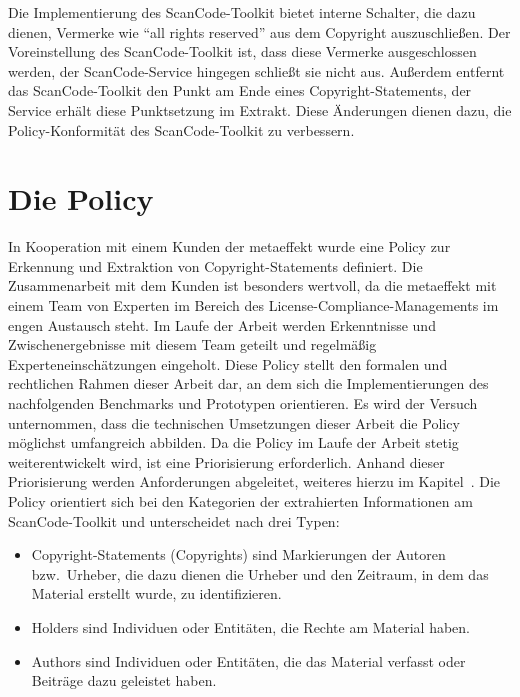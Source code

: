 Die Implementierung des ScanCode-Toolkit bietet interne Schalter, die dazu dienen, Vermerke wie \enquote{all rights reserved} aus dem Copyright auszuschließen.
Der Voreinstellung des ScanCode-Toolkit ist, dass diese Vermerke ausgeschlossen werden, der ScanCode-Service hingegen schließt sie nicht aus.
Außerdem entfernt das ScanCode-Toolkit den Punkt am Ende eines Copyright-Statements, der Service erhält diese Punktsetzung im Extrakt.
Diese Änderungen dienen dazu, die Policy-Konformität des ScanCode-Toolkit zu verbessern\autocite{noauthor_metaeffekt-scancode-service_2025}.


\section{Die Policy}\label{sec:policy}

In Kooperation mit einem Kunden der metaeffekt wurde eine Policy zur Erkennung und Extraktion von Copyright-Statements definiert.
Die Zusammenarbeit mit dem Kunden ist besonders wertvoll, da die metaeffekt mit einem Team von Experten im Bereich des License-Compliance-Managements im engen Austausch steht.
Im Laufe der Arbeit werden Erkenntnisse und Zwischenergebnisse mit diesem Team geteilt und regelmäßig Experteneinschätzungen eingeholt.
Diese Policy stellt den formalen und rechtlichen Rahmen dieser Arbeit dar, an dem sich die Implementierungen des nachfolgenden Benchmarks und Prototypen orientieren.
Es wird der Versuch unternommen, dass die technischen Umsetzungen dieser Arbeit die Policy möglichst umfangreich abbilden.
Da die Policy im Laufe der Arbeit stetig weiterentwickelt wird, ist eine Priorisierung erforderlich.
Anhand dieser Priorisierung werden Anforderungen abgeleitet, weiteres hierzu im Kapitel~.
Die Policy orientiert sich bei den Kategorien der extrahierten Informationen am ScanCode-Toolkit und unterscheidet nach drei Typen:
\begin{itemize}
    \item Copyright-Statements (Copyrights) sind Markierungen der Autoren bzw.\ Urheber, die dazu dienen die Urheber und den Zeitraum, in dem das Material erstellt wurde, zu identifizieren.
    \item Holders sind Individuen oder Entitäten, die Rechte am Material haben.
    \item Authors sind Individuen oder Entitäten, die das Material verfasst oder Beiträge dazu geleistet haben.
\end{itemize}

